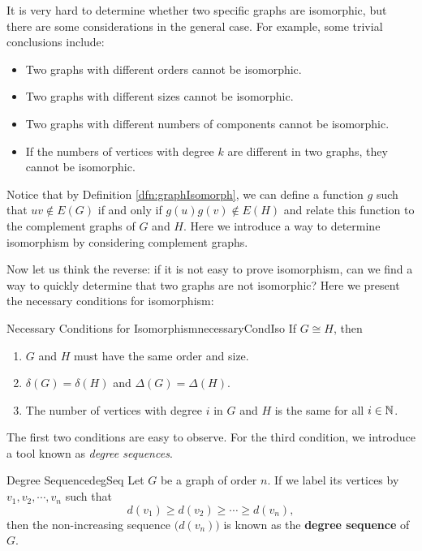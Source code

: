 \documentclass[math]{amznotes}
\makeatletter
\let\save@mathaccent\mathaccent
\newcommand*\if@single[3]{%
  \setbox0\hbox{${\mathaccent"0362{#1}}^H$}%
  \setbox2\hbox{${\mathaccent"0362{\kern0pt#1}}^H$}%
  \ifdim\ht0=\ht2 #3\else #2\fi
  }
\newcommand*\rel@kern[1]{\kern#1\dimexpr\macc@kerna}
\newcommand*\widebar[1]{\@ifnextchar^{{\wide@bar{#1}{0}}}{\wide@bar{#1}{1}}}
\newcommand*\wide@bar[2]{\if@single{#1}{\wide@bar@{#1}{#2}{1}}{\wide@bar@{#1}{#2}{2}}}
\newcommand*\wide@bar@[3]{%
  \begingroup
  \def\mathaccent##1##2{%
    \let\mathaccent\save@mathaccent
    \if#32 \let\macc@nucleus\first@char \fi
    \setbox\z@\hbox{$\macc@style{\macc@nucleus}_{}$}%
    \setbox\tw@\hbox{$\macc@style{\macc@nucleus}{}_{}$}%
    \dimen@\wd\tw@
    \advance\dimen@-\wd\z@
    \divide\dimen@ 3
    \@tempdima\wd\tw@
    \advance\@tempdima-\scriptspace
    \divide\@tempdima 10
    \advance\dimen@-\@tempdima
    \ifdim\dimen@>\z@ \dimen@0pt\fi
    \rel@kern{0.6}\kern-\dimen@
    \if#31
      \overline{\rel@kern{-0.6}\kern\dimen@\macc@nucleus\rel@kern{0.4}\kern\dimen@}%
      \advance\dimen@0.4\dimexpr\macc@kerna
      \let\final@kern#2%
      \ifdim\dimen@<\z@ \let\final@kern1\fi
      \if\final@kern1 \kern-\dimen@\fi
    \else
      \overline{\rel@kern{-0.6}\kern\dimen@#1}%
    \fi
  }%
  \macc@depth\@ne
  \let\math@bgroup\@empty \let\math@egroup\macc@set@skewchar
  \mathsurround\z@ \frozen@everymath{\mathgroup\macc@group\relax}%
  \macc@set@skewchar\relax
  \let\mathaccentV\macc@nested@a
  \if#31
    \macc@nested@a\relax111{#1}%
  \else
    \def\gobble@till@marker##1\endmarker{}%
    \futurelet\first@char\gobble@till@marker#1\endmarker
    \ifcat\noexpand\first@char A\else
      \def\first@char{}%
    \fi
    \macc@nested@a\relax111{\first@char}%
  \fi
  \endgroup
}
\theoremstyle{remark}
\newcommand{\0}{\mathbf{0}}
\newcommand{\1}{\mathbf{1}}
\makeatother
\begin{document}
It is very hard to determine whether two specific graphs are isomorphic, but there are some considerations in the general case. For example, some trivial conclusions include:
\begin{itemize}
    \item Two graphs with different orders cannot be isomorphic.
    \item Two graphs with different sizes cannot be isomorphic.
    \item Two graphs with different numbers of components cannot be isomorphic.
    \item If the numbers of vertices with degree $k$ are different in two graphs, they cannot be isomorphic.
\end{itemize}
Notice that by Definition \ref{dfn:graphIsomorph}, we can define a function $g$ such that $uv \notin E(G)$ if and only if $g(u)g(v) \notin E(H)$ and relate this function to the complement graphs of $G$ and $H$. Here we introduce a way to determine isomorphism by considering complement graphs.
Now let us think the reverse: if it is not easy to prove isomorphism, can we find a way to quickly determine that two graphs are not isomorphic? Here we present the necessary conditions for isomorphism:
\begin{thmbox}{Necessary Conditions for Isomorphism}{necessaryCondIso}
    If $G \cong H$, then
    \begin{enumerate}
        \item $G$ and $H$ must have the same order and size.
        \item $\delta(G) = \delta(H)$ and $\Delta(G) = \Delta(H)$.
        \item The number of vertices with degree $i$ in $G$ and $H$ is the same for all $i \in \mathbb{N}$.
    \end{enumerate}
\end{thmbox}
The first two conditions are easy to observe. For the third condition, we introduce a tool known as \textit{degree sequences}.
\begin{dfnbox}{Degree Sequence}{degSeq}
    Let $G$ be a graph of order $n$. If we label its vertices by $v_1, v_2, \cdots, v_n$ such that
    \begin{equation*}
        d(v_1) \geq d(v_2) \geq \cdots \geq d(v_n),
    \end{equation*}
    then the non-increasing sequence $\bigl(d(v_n)\bigr)$ is known as the {\color{red} \textbf{degree sequence}} of $G$.
\end{dfnbox}
\end{document}
